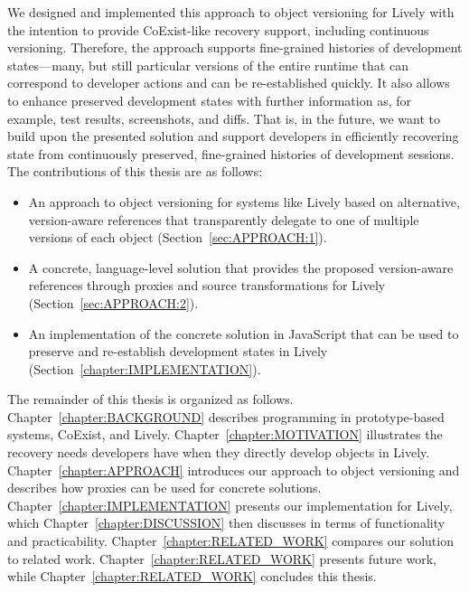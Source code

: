We designed and implemented this approach to object versioning for Lively with the intention to provide CoExist-like recovery support, including continuous versioning.
Therefore, the approach supports fine-grained histories of development states---many, but still particular versions of the entire runtime that can correspond to developer actions and can be re-established quickly.
It also allows to enhance preserved development states with further information as, for example, test results, screenshots, and diffs.
That is, in the future, we want to build upon the presented solution and support developers in efficiently recovering state from continuously preserved, fine-grained histories of development sessions.\\

The contributions of this thesis are as follows:
\begin{itemize}
    \item An approach to object versioning for systems like Lively based on alternative, version-aware references that transparently delegate to one of multiple versions of each object (Section~\ref{sec:APPROACH:1}).
    \item A concrete, language-level solution that provides the proposed version-aware references through proxies and source transformations for Lively (Section~\ref{sec:APPROACH:2}).
    \item An implementation of the concrete solution in JavaScript that can be used to preserve and re-establish development states in Lively (Section~\ref{chapter:IMPLEMENTATION}).\\
\end{itemize}

The remainder of this thesis is organized as follows. 
Chapter~\ref{chapter:BACKGROUND} describes programming in prototype-based systems, CoExist, and Lively.
Chapter~\ref{chapter:MOTIVATION} illustrates the recovery needs developers have when they directly develop objects in Lively.
Chapter~\ref{chapter:APPROACH} introduces our approach to object versioning and describes how proxies can be used for concrete solutions.
Chapter~\ref{chapter:IMPLEMENTATION} presents our implementation for Lively, which Chapter~\ref{chapter:DISCUSSION} then discusses in terms of functionality and practicability.
Chapter~\ref{chapter:RELATED_WORK} compares our solution to related work.
Chapter~\ref{chapter:RELATED_WORK} presents future work, while Chapter~\ref{chapter:RELATED_WORK} concludes this thesis.
